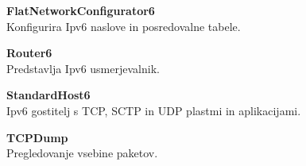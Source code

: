 \documentclass[11pt,a4paper,slovene]{myarticle}
\begin{document}
\textbf{FlatNetworkConfigurator6}\\
Konfigurira Ipv6 naslove in posredovalne tabele.

\textbf{Router6}\\
Predstavlja Ipv6 usmerjevalnik.

\textbf{StandardHost6}\\
Ipv6 gostitelj s TCP, SCTP in UDP plastmi in aplikacijami.

\textbf{TCPDump}\\
Pregledovanje vsebine paketov.



\pagebreak


\end{document}
